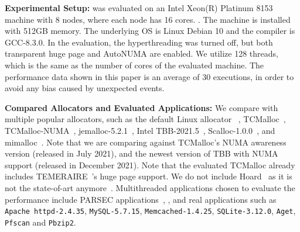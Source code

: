 \textbf{Experimental Setup:}  \NM{} was evaluated on an Intel Xeon(R) Platinum 8153 machine with 8 nodes, where each node has 16 cores.  . The machine is installed with 512GB memory.  The underlying OS is Linux Debian 10 and the compiler is GCC-8.3.0. In the evaluation, the hyperthreading was turned off, but both transparent huge page and AutoNUMA are enabled. We utilize 128 threads, which is the same as the number of cores of the evaluated machine.  The performance data shown in this paper is an average of 30 executions, in order to avoid any bias caused by unexpected events.


\textbf{Compared Allocators and Evaluated Applications: }  We compare \NM{} with multiple popular allocators, such as the default Linux allocator ~\cite{glibcweb}, TCMalloc~\cite{tcmalloc2},  TCMalloc-NUMA~\cite{tcmallocnuma}, jemalloc-5.2.1~\cite{jemalloc}, Intel TBB-2021.5~\cite{tbb2}, Scalloc-1.0.0~\cite{Scalloc}, and mimalloc~\cite{mimalloc}. Note that we are comparing against TCMalloc's NUMA awareness version (released in July 2021), and the newest version of TBB with NUMA support (released in December 2021). Note that the evaluated TCMalloc already includes TEMERAIRE~\cite{TEMERAIRE}'s huge page support. 
We do not include Hoard~\cite{Hoard} as it is not the state-of-art anymore~\cite{Scalloc, mimalloc}. Multithreaded applications chosen to evaluate the performance include PARSEC applications~\cite{parsec}, , and real applications such as \texttt{Apache httpd-2.4.35}, \texttt{MySQL-5.7.15}, \texttt{Memcached-1.4.25}, \texttt{SQLite-3.12.0}, \texttt{Aget}, \texttt{Pfscan} and \texttt{Pbzip2}.

